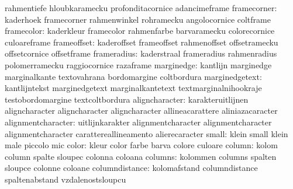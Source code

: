                            rahmentiefe               hloubkaramecku
                           profonditacornice         adancimeframe
              framecorner: kaderhoek                 framecorner
                           rahmenwinkel              rohramecku
                           angolocornice             coltframe
               framecolor: kaderkleur                framecolor
                           rahmenfarbe               barvaramecku
                           colorecornice             culoareframe
              frameoffset: kaderoffset               frameoffset
                           rahmenoffset              offsetramecku
                           offsetcornice             offsetframe
              frameradius: kaderstraal               frameradius
                           rahmenradius              polomerramecku
                           raggiocornice             razaframe
               marginedge: kantlijn                  marginedge
                           marginalkante             textovahrana
                           bordomargine              coltbordura
           marginedgetext: kantlijntekst             marginedgetext
                           marginalkantetext         textmarginalnihookraje
                           testobordomargine         textcoltbordura
           aligncharacter: karakteruitlijnen         aligncharacter
                           aligncharacter            aligncharacter
                           allineacarattere          aliniazacaracter %
       alignmentcharacter: uitlijnkarakter           alignmentcharacter
                           alignmentcharacter        alignmentcharacter
                           carattereallineamento     alierecaracter %
                    small: klein                     small
                           klein                     male
                           piccolo                   mic
                    color: kleur                     color
                           farbe                     barva
                           colore                    culoare
                   column: kolom                     column
                           spalte                    sloupec
                           colonna                   coloana
                  columns: kolommen                  columns
                           spalten                   sloupce
                           colonne                   coloane
           columndistance: kolomafstand              columndistance
                           spaltenabstand            vzdalenostsloupcu
